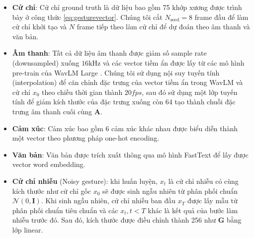 \begin{itemize}
	\item \textbf{Cử chỉ}: Cử chỉ ground truth là dữ liệu bao gồm 75 khớp xương được trình bày ở công thức \ref{eq:gesturevector}. Chúng tôi cắt $N_{\text{seed}} = 8$ frame đầu để làm cử chỉ khởi tạo và $N$ frame tiếp theo làm cử chỉ để dự đoán theo âm thanh và văn bản.
	
  \item \textbf{Âm thanh}: Tất cả dữ liệu âm thanh được giảm số sample rate (downsampled) xuống $16 \mathrm{kHz}$ và các vector tiềm ẩn được lấy từ các mô hình pre-train của WavLM Large \cite{chen2022wavlm}. Chúng tôi sử dụng nội suy tuyến tính (interpolation) để căn chỉnh đặc trưng của vector tiềm ẩn trong WavLM và cử chỉ $x_{0}$ theo chiều thời gian thành $20fps$, sau đó sử dụng một lớp tuyến tính để giảm kích thước của đặc trưng xuống còn 64 tạo thành chuỗi đặc trưng âm thanh cuối cùng $\mathbf{A}$.
		
	\item \textbf{Cảm xúc}: Cảm xúc bao gồm 6 cảm xúc khác nhau được biểu diễn thành một vector theo phương pháp one-hot encoding.
	
	\item \textbf{Văn bản}: Văn bản được trích xuất thông qua mô hình FastText \cite{yoon2022genea} để lấy được vector word embedding.
	
	\item \textbf{Cử chỉ nhiễu} (Noisy gesture): khi huấn luyện, $x_{t}$ là cử chỉ nhiễu có cùng kích thước như cử chỉ gốc $x_{0}$ sẽ được sinh ngẫu nhiên từ phân phối chuẩn $\mathcal{N}(0, \mathbf{I})$. Khi sinh ngẫu nhiên, cử chỉ nhiễu ban đầu $x_{T}$ được lấy mẫu từ phân phối chuẩn tiêu chuẩn và các $x_{t}, t<T$ khác là kết quả của bước làm nhiễu trước đó. Sau đó, kích thước được điều chỉnh thành 256 như $\mathbf{G}$ bằng lớp linear.
	
\end{itemize}


